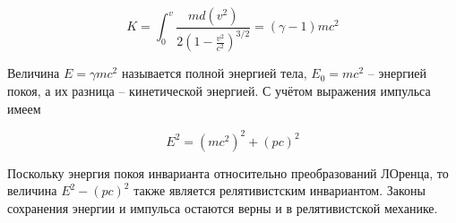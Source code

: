\begin{equation}
    K = \int_0^v \frac{m d \left( v^2 \right)}{2 \left( 1 - \frac{v^2}{c^2} \right)^{3/2}} = \left( \gamma - 1 \right) m c^2
\end{equation}

Величина $E = \gamma m c^2$ называется полной энергией тела, $E_0 = m c^2$ -- энергией покоя, а их разница -- кинетической энергией. С учётом выражения импульса имеем

\begin{equation}
    E^2 = \left( m c^2 \right)^2 + \left( p c \right)^2
\end{equation}

Поскольку энергия покоя инварианта относительно преобразований ЛОренца, то величина $E^2 - \left( p c \right)^2$ также является релятивистским инвариантом. Законы сохранения энергии и импульса остаются верны и в релятивистской механике.